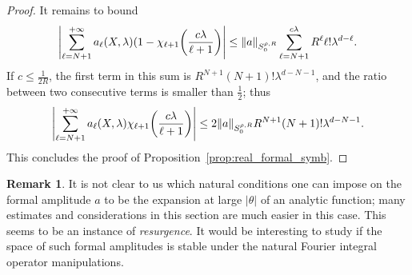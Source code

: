 \documentclass[10pt]{amsart}
\theoremstyle{definition}\newtheorem{defi}[theo]{Definition}\newtheorem{rema}[theo]{Remark}\newtheorem{exam}[theo]{Example}\newtheorem{exem}[theo]{Example}\newtheorem{nota}[theo]{Notation}
\newcommand\1{\mathds{1}}
\let\originalleft\left
\let\originalright\right
\renewcommand{\left}{\mathopen{}\mathclose\bgroup\originalleft}
\renewcommand{\right}{\aftergroup\egroup\originalright}
\begin{document}
\begin{proof}
It remains to bound
\[
\left|\sum_{\ell=N+1}^{+\infty}a_\ell(X,\lambda)(1-\chi_{\ell+1}\left(\frac{c\lambda}{\ell+1}\right)\right|\leq \|a\|_{S^{\rho,R}_0}
\sum_{\ell=N+1}^{c\lambda}R^{\ell}\ell!\lambda^{d-\ell}.
\]
If $c\leq \frac{1}{2R}$, the first term in this sum is $R^{N+1}(N+1)!\lambda^{d-N-1}$, and the ratio between two consecutive terms is smaller than $\frac{1}{2}$; thus
\[
\left|\sum_{\ell=N+1}^{+\infty}a_\ell(X,\lambda)\chi_{\ell+1}\left(\frac{c\lambda}{\ell+1}\right)\right|\leq 2\|a\|_{S^{\rho,R}_0}R^{N+1}(N+1)!\lambda^{d-N-1}.
\]
This concludes the proof of Proposition~\ref{prop:real_formal_symb}.
\end{proof}

\begin{rema}\label{rem:Resurgence}
It is not clear to us which natural conditions one can impose on the formal amplitude $a$ to be the expansion at large $|\theta|$ of an analytic function; many estimates and considerations in this section are much easier in this case. This seems to be an instance of
\emph{resurgence}. It would be interesting to study if the space of such formal amplitudes is stable under the natural Fourier integral operator manipulations.
\end{rema}
\end{document}
